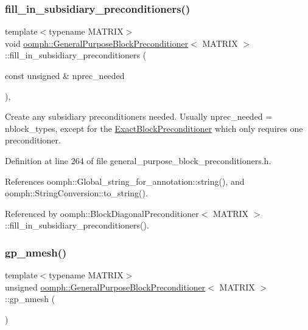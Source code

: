 \subsubsection{\texorpdfstring{fill\+\_\+in\+\_\+subsidiary\+\_\+preconditioners()}{fill\_in\_subsidiary\_preconditioners()}}
{\footnotesize\ttfamily template$<$typename M\+A\+T\+R\+IX$>$ \\
void \hyperlink{classoomph_1_1GeneralPurposeBlockPreconditioner}{oomph\+::\+General\+Purpose\+Block\+Preconditioner}$<$ M\+A\+T\+R\+IX $>$\+::fill\+\_\+in\+\_\+subsidiary\+\_\+preconditioners (\begin{DoxyParamCaption}\item[{const unsigned \&}]{nprec\+\_\+needed }\end{DoxyParamCaption})\hspace{0.3cm}{\ttfamily [inline]}, {\ttfamily [protected]}}



Create any subsidiary preconditioners needed. Usually nprec\+\_\+needed = nblock\+\_\+types, except for the \hyperlink{classoomph_1_1ExactBlockPreconditioner}{Exact\+Block\+Preconditioner} which only requires one preconditioner. 



Definition at line 264 of file general\+\_\+purpose\+\_\+block\+\_\+preconditioners.\+h.



References oomph\+::\+Global\+\_\+string\+\_\+for\+\_\+annotation\+::string(), and oomph\+::\+String\+Conversion\+::to\+\_\+string().



Referenced by oomph\+::\+Block\+Diagonal\+Preconditioner$<$ M\+A\+T\+R\+I\+X $>$\+::fill\+\_\+in\+\_\+subsidiary\+\_\+preconditioners().

\mbox{\label{classoomph_1_1GeneralPurposeBlockPreconditioner_af4bfec71b00d7d7e8021c691d1cbe076}} 
\subsubsection{\texorpdfstring{gp\+\_\+nmesh()}{gp\_nmesh()}}
{\footnotesize\ttfamily template$<$typename M\+A\+T\+R\+IX$>$ \\
unsigned \hyperlink{classoomph_1_1GeneralPurposeBlockPreconditioner}{oomph\+::\+General\+Purpose\+Block\+Preconditioner}$<$ M\+A\+T\+R\+IX $>$\+::gp\+\_\+nmesh (\begin{DoxyParamCaption}{ }\end{DoxyParamCaption})\hspace{0.3cm}{\ttfamily [inline]}}



